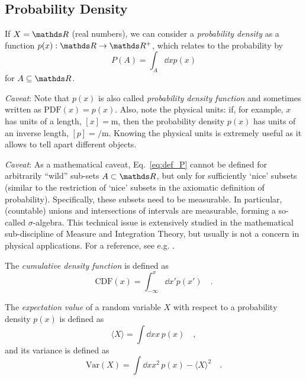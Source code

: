 \documentclass{notebook}
\newcommand{\Caveat}{\textit{Caveat}}
\begin{document}
\subsection*{Probability Density}

If $X = \R$ (real numbers), we can consider a \textit{probability density} 
as a function $p(x) : \R \to \R^+$, which relates to the probability by
%
\begin{equation}
\label{eq:def_P}
P(A) = \int_A{\dd{x} p(x)}
\end{equation}
%
for $A \subseteq \R$. 

\Caveat: Note that $p(x)$ is also called \textit{probability density function} 
and sometimes written as $\mathrm{PDF}(x) = p(x)$. 
Also, note the physical units: 
if, for example, $x$ has units of a length, $[x] = \si{\meter}$, 
then the probability density $p(x)$ has units of an inverse length, $[p] = \si{\per \meter}$. 
Knowing the physical units is extremely useful as it allows to tell apart different objects.

\Caveat: As a mathematical caveat, Eq.~\eqref{eq:def_P} cannot be defined for arbitrarily ``wild'' sub-sets $A \subset \R$, but only for sufficiently `nice' subsets (similar to the restriction of `nice' subsets in the axiomatic definition of probability). 
Specifically, these subsets need to be measurable. 
In particular, (countable) unions and intersections of intervals are measurable, 
forming a so-called $\sigma$-algebra. 
This technical issue is extensively studied in the mathematical sub-discipline of Measure and Integration Theory, but usually is not a concern in physical applications.
For a reference, see e.g. \cite{Billingsley2012}.

The \textit{cumulative density function} is defined as
\begin{equation}
\mathrm{CDF}(x) = \int^x_{-\infty}{\dd{x'} p(x')} \quad.
\end{equation}

The \textit{expectation value} of a random variable $X$ with respect to a probability density $p(x)$ is defined as
%
\begin{equation}
\langle X \rangle = \int \dd{x} x \, p(x) \quad,
\label{eq:expvalue}
\end{equation}
%
and its variance is defined as
%
\begin{equation}
	\text{Var}(X) = \int \dd{x} x^2 \, p(x) - \langle X \rangle^2 \quad .
	\label{eq:variance}
\end{equation}
%
\end{document}
